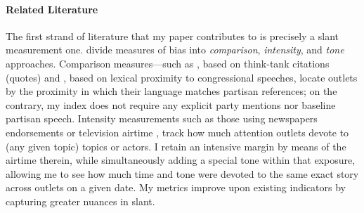 \documentclass[12pt]{article}
\begin{document}

	
	
	
	
	\paragraph{Related Literature}
	
	
	The first strand of literature that my paper contributes to is precisely a slant measurement one. \citet{puglisi_review} divide measures of bias into  \textit{comparison},  \textit{intensity}, and  \textit{tone} approaches. Comparison measures—such as \citet{milyo_measure}, based on think-tank citations (quotes) and \citet{gentzkow2010media}, based on lexical proximity to congressional speeches, locate outlets by the proximity in which their language matches partisan references; on the contrary, my index does not require any explicit party mentions nor baseline partisan speech. Intensity measurements such as those using newspapers endorsements \citep{ChiangKnight2011} or television airtime \citep{durante2012partisan,CageHengelHerveUrvoy2022}, track how much attention outlets devote to (any given topic) topics or actors. I retain an intensive margin by means of the airtime therein, while simultaneously adding a special tone within that exposure, allowing me to see how much time and tone were devoted to the same exact story across outlets on a given date. My metrics improve upon existing indicators by capturing greater nuances in slant. 
	
	
	
	
	
	
	
\end{document}
